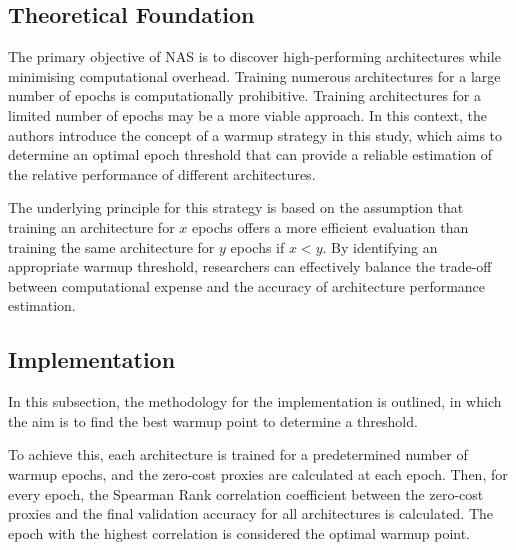 \subsection{Theoretical Foundation}

The primary objective of \gls{NAS} is to discover high-performing architectures while minimising computational overhead. Training numerous architectures for a large number of epochs is computationally prohibitive. Training architectures for a limited number of epochs may be a more viable approach. In this context, the authors introduce the concept of a warmup strategy in this study, which aims to determine an optimal epoch threshold that can provide a reliable estimation of the relative performance of different architectures.

The underlying principle for this strategy is based on the assumption that training an architecture for $x$ epochs offers a more efficient evaluation than training the same architecture for $y$ epochs if $x < y$. By identifying an appropriate warmup threshold, researchers can effectively balance the trade-off between computational expense and the accuracy of architecture performance estimation.


\subsection{Implementation}
In this subsection, the methodology for the implementation is outlined, in which the aim is to find the best warmup point to determine a threshold. 

To achieve this, each architecture is trained for a predetermined number of warmup epochs, and the zero-cost proxies are calculated at each epoch. Then, for every epoch, the Spearman Rank correlation coefficient between the zero-cost proxies and the final validation accuracy for all architectures is calculated. The epoch with the highest correlation is considered the optimal warmup point. 

\begin{comment}
    
By combining the warmup concept with zero-cost proxies in the project, one can take advantage of early training dynamics to improve the accuracy and reliability of performance estimation. This improved performance prediction allows for more efficient exploration and use of the search space in \gls{NAS}, ultimately leading to better architectures with lower search costs.
\end{comment}

